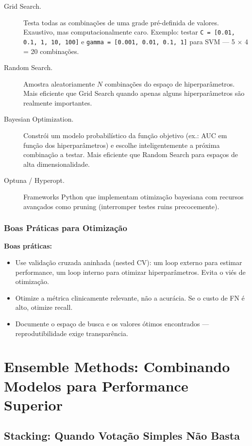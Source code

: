 \begin{description}
    \item[Grid Search.] Testa todas as combinações de uma grade pré-definida de valores. Exaustivo, mas computacionalmente caro. Exemplo: testar \texttt{C = [0.01, 0.1, 1, 10, 100]} e \texttt{gamma = [0.001, 0.01, 0.1, 1]} para SVM — 5 $\times$ 4 = 20 combinações.
    \item[Random Search.] Amostra aleatoriamente $N$ combinações do espaço de hiperparâmetros. Mais eficiente que Grid Search quando apenas alguns hiperparâmetros são realmente importantes.
    \item[Bayesian Optimization.] Constrói um modelo probabilístico da função objetivo (ex.: AUC em função dos hiperparâmetros) e escolhe inteligentemente a próxima combinação a testar. Mais eficiente que Random Search para espaços de alta dimensionalidade.
    \item[Optuna / Hyperopt.] Frameworks Python que implementam otimização bayesiana com recursos avançados como pruning (interromper testes ruins precocemente).
\end{description}

\subsubsection{Boas Práticas para Otimização}

\textbf{Boas práticas:}
\begin{itemize}
    \item Use validação cruzada aninhada (nested CV): um loop externo para estimar performance, um loop interno para otimizar hiperparâmetros. Evita o viés de otimização.
    \item Otimize a métrica clinicamente relevante, não a acurácia. Se o custo de FN é alto, otimize recall.
    \item Documente o espaço de busca e os valores ótimos encontrados — reprodutibilidade exige transparência.
\end{itemize}

\section{Ensemble Methods: Combinando Modelos para Performance Superior}

\subsection{Stacking: Quando Votação Simples Não Basta}

